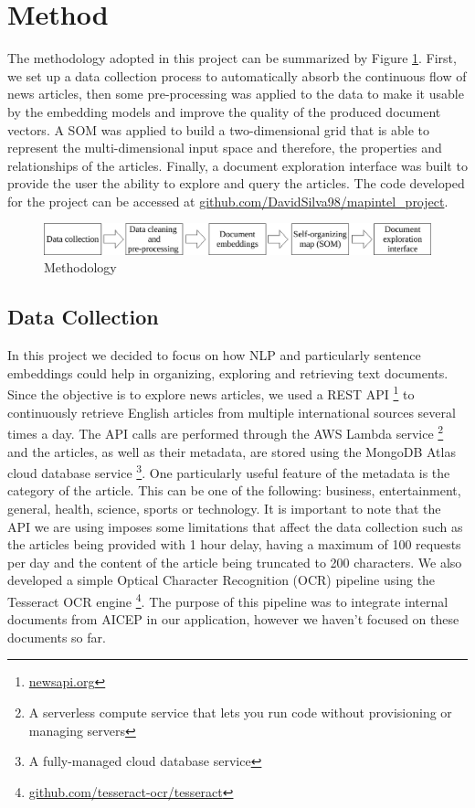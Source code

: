 \documentclass[a4paper]{article}
\begin{document}
\section*{Method}
The methodology adopted in this project can be summarized by Figure \ref{Methodology}. First, we set up a data collection process to automatically absorb the continuous flow of news articles, then some pre-processing was applied to the data to make it usable by the embedding models and improve the quality of the produced document vectors. A SOM was applied to build a two-dimensional grid that is able to represent the multi-dimensional input space and therefore, the properties and relationships of the articles. Finally, a document exploration interface was built to provide the user the ability to explore and query the articles. The code developed for the project can be accessed at \href{https://github.com/DavidSilva98/mapintel_project}{github.com/DavidSilva98/mapintel\_project}.
\begin{figure}[H]
	\centering
	\includegraphics[scale=0.7]{./figures/methodology}
	\caption{Methodology}
	\label{Methodology}
\end{figure}
\subsection*{Data Collection}
In this project we decided to focus on how NLP and particularly sentence embeddings could help in organizing, exploring and retrieving text documents. Since the objective is to explore news articles, we used a REST API \footnote{\href{https://newsapi.org/}{newsapi.org}} to continuously retrieve English articles from multiple international sources several times a day. The API calls are performed through the AWS Lambda service \footnote{A serverless compute service that lets you run code without provisioning or managing servers} and the articles, as well as their metadata, are stored using the MongoDB Atlas cloud database service \footnote{A fully-managed cloud database service}. One particularly useful feature of the metadata is the category of the article. This can be one of the following: business, entertainment, general, health, science, sports or technology. It is important to note that the API we are using imposes some limitations that affect the data collection such as the articles being provided with 1 hour delay, having a maximum of 100 requests per day and the content of the article being truncated to 200 characters. We also developed a simple Optical Character Recognition (OCR) pipeline using the Tesseract OCR engine \footnote{\href{https://github.com/tesseract-ocr/tesseract}{github.com/tesseract-ocr/tesseract}}. The purpose of this pipeline was to integrate internal documents from AICEP in our application, however we haven't focused on these documents so far.
\end{document}
